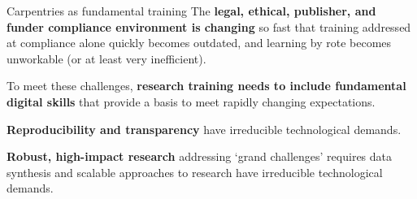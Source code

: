 \documentclass[aspectratio=169, 11pt]{beamer} %
\begin{document}
\begin{frame}{Carpentries as fundamental training}
     The \textbf{legal, ethical, publisher, and funder compliance environment is changing} so fast that training addressed at compliance alone quickly becomes outdated, and learning by rote becomes unworkable (or at least very inefficient). \par
     To meet these challenges, \textbf{research training needs to include fundamental digital skills} that provide a basis to meet rapidly changing expectations. \par
     \textbf{Reproducibility and transparency} have irreducible technological demands. \par
     \textbf{Robust, high-impact research} addressing `grand challenges'  requires data synthesis and scalable approaches to research have  irreducible technological demands.
\end{frame}
\end{document}
